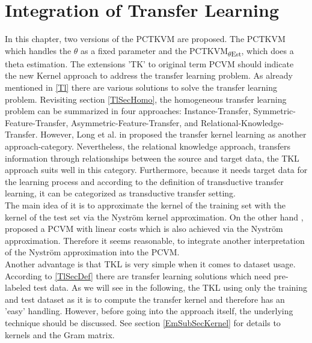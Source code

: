\chapter{Integration of Transfer Learning}\label{In}
In this chapter, two versions of the \ac{PCTKVM} are proposed.
The \acs{PCTKVM} which handles the $\theta$ as a fixed parameter and the \acs{PCTKVM}\textsubscript{$\theta$Est}, which does a theta estimation.
The extensions 'TK' to original term \acs{PCVM} should indicate the new Kernel approach to address the transfer learning problem.
As already mentioned in \ref{Tl} there are various solutions to solve the transfer learning problem.
Revisiting section \ref{TlSecHomo}, the homogeneous transfer learning problem can be summarized in four approaches: Instance-Transfer, Symmetric-Feature-Transfer, Asymmetric-Feature-Transfer, and Relational-Knowledge-Transfer.\newline
However, Long et al. in \cite{Long.2015} proposed the transfer kernel learning as another approach-category.
Nevertheless, the relational knowledge approach, transfers information through relationships between the source and target data, the \acs{TKL} approach suits well in this category.
Furthermore, because it needs target data for the learning process and according to the definition of transductive transfer learning, it can be categorized as transductive transfer setting.\\
The main idea of it is to approximate the kernel of the training set with the kernel of the test set via the Nyström kernel approximation.\cite{Long.2015}
On the other hand \cite{Schleif.2015}, proposed a \acs{PCVM} with linear costs which is also achieved via the Nyström approximation.
Therefore it seems reasonable, to integrate another interpretation of the Nyström approximation into the \acs{PCVM}.\\
Another advantage is that \acs{TKL} is very simple when it comes to dataset usage.
According to \ref{TlSecDef} there are transfer learning solutions which need pre-labeled test data.
As we will see in the following, the \acs{TKL} using only the training and test dataset as it is to compute the transfer kernel and therefore has an 'easy' handling.\newline
However, before going into the approach itself, the underlying technique should be discussed.
See section \ref{EmSubSecKernel} for details to kernels and the Gram matrix.
